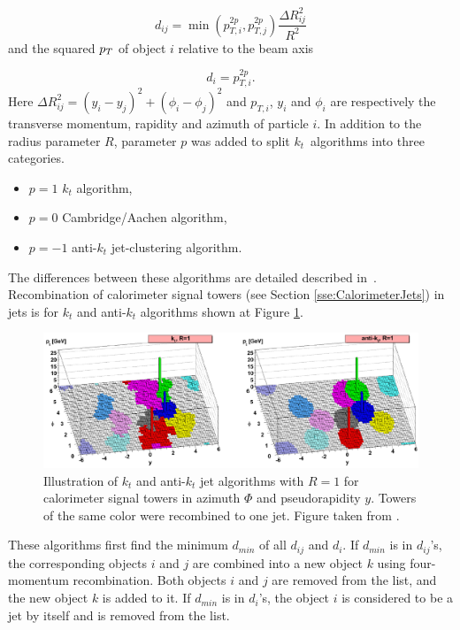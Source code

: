 \begin{equation}
	d_{ij} = \min{\left( p_{T,i}^{2p} , p_{T,j}^{2p} \right)} \frac{\Delta R_{ij}^2}{R^2}
\end{equation}
and the squared $p_{T}$ of object $i$ relative to the beam axis

\begin{equation}
	d_i = p_{T,i}^{2p}.
\end{equation}
Here $\Delta R_{ij}^2 = (y_i - y_j)^2 + (\phi_i - \phi_j)^2$ and $p_{T,i}$,
$y_i$ and $\phi_i$ are respectively the transverse momentum, rapidity and
azimuth of particle $i$. In addition to the radius parameter $R$, parameter $p$
was added to split $k_t$~algorithms into three categories.  
\begin{itemize}
	\item $p = 1$ $k_t$ algorithm,
	\item $p = 0$ Cambridge/Aachen algorithm,
	\item $p = -1$ anti-$k_t$ jet-clustering algorithm.
\end{itemize}
The differences between these algorithms are detailed described
in~\cite{ANTIKT}. Recombination of calorimeter signal towers (see Section
\ref{sse:CalorimeterJets}) in jets is for $k_t$ and anti-$k_t$ algorithms shown
at Figure \ref{fig:JetRecombination}.

\begin{figure}[t]
  \centering
  \includegraphics[width=\textwidth]{Chapter2/JetRecombination.png}
  \caption{Illustration of $k_t$ and anti-$k_t$ jet algorithms with $R=1$ for
    calorimeter signal towers in azimuth $\Phi$ and pseudorapidity $y$. Towers of
    the same color were recombined to one jet. Figure taken from
    \cite{JetTheoreticalPictures}.} 
  \label{fig:JetRecombination}
\end{figure}

These algorithms first find the minimum $d_{min}$ of all $d_{ij}$ and $d_i$. If
$d_{min}$ is in $d_{ij}$'s, the corresponding objects $i$ and $j$ are combined
into a new object $k$ using four-momentum recombination. Both objects $i$ and
$j$ are removed from the list, and the new object $k$ is added to it. If
$d_{min}$ is in $d_i$'s, the object $i$ is considered to be a jet by itself and
is removed from the list.

